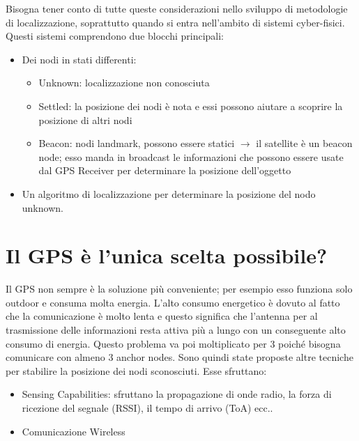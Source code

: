         Bisogna tener conto di tutte queste considerazioni nello sviluppo di
metodologie di localizzazione, soprattutto quando si entra nell'ambito di
sistemi cyber-fisici.
        Questi sistemi comprendono due blocchi principali:
        \begin{itemize}
                \item Dei nodi in stati differenti:
                \begin{itemize}
                        \item Unknown: localizzazione non conosciuta
                        \item Settled: la posizione dei nodi è nota e essi
possono aiutare a scoprire la posizione di altri nodi
                        \item Beacon: nodi landmark, possono essere statici
$\rightarrow$ il satellite è un beacon node; esso manda in broadcast le
informazioni che possono essere usate dal GPS Receiver per determinare la
posizione dell'oggetto
                \end{itemize}
                \item Un algoritmo di localizzazione per determinare la
posizione del nodo unknown.
        \end{itemize}

                \section{Il GPS è l'unica scelta
possibile?}\label{subsubsec3.1.1}
                Il GPS non sempre è la soluzione più conveniente; per esempio
esso funziona solo outdoor e consuma molta energia. L'alto consumo energetico è
dovuto al fatto che la comunicazione è molto lenta e questo significa che
l'antenna per al trasmissione delle informazioni resta attiva più a lungo con un
conseguente alto consumo di energia. Questo problema va poi moltiplicato per 3
poiché bisogna comunicare con almeno 3 anchor nodes.
                Sono quindi state proposte altre tecniche per stabilire la
posizione dei nodi sconosciuti. Esse sfruttano:
                \begin{itemize}
                        \item Sensing Capabilities: sfruttano la propagazione di
onde radio, la forza di ricezione del segnale (RSSI), il tempo di arrivo (ToA)
ecc..
                        \item Comunicazione Wireless
                \end{itemize}

